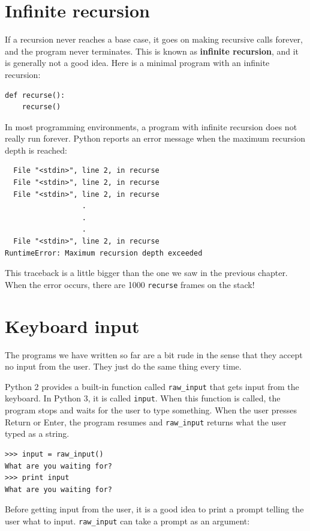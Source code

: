 \documentclass[10pt]{book}
\begin{document}
\begin{CJK}{UTF8}{gbsn}
\section{Infinite recursion}

If a recursion never reaches a base case, it goes on making
recursive calls forever, and the program never terminates.  This is
known as {\bf infinite recursion}, and it is generally not
a good idea.  Here is a minimal program with an infinite recursion:

\begin{verbatim}
def recurse():
    recurse()
\end{verbatim}
%
In most programming environments, a program with infinite recursion
does not really run forever.  Python reports an error
message when the maximum recursion depth is reached:

\begin{verbatim}
  File "<stdin>", line 2, in recurse
  File "<stdin>", line 2, in recurse
  File "<stdin>", line 2, in recurse
                  .   
                  .
                  .
  File "<stdin>", line 2, in recurse
RuntimeError: Maximum recursion depth exceeded
\end{verbatim}
%
This traceback is a little bigger than the one we saw in the
previous chapter.  When the error occurs, there are 1000
{\tt recurse} frames on the stack!


\section{Keyboard input}

The programs we have written so far are a bit rude in the sense that
they accept no input from the user.  They just do the same thing every
time.

Python 2 provides a built-in function called \verb"raw_input" that gets
input from the keyboard.  In Python 3, it is called
  {\tt input}.  When this function is called, the program stops and
waits for the user to type something.  When the user presses {\sf
  Return} or {\sf Enter}, the program resumes and \verb"raw_input"
returns what the user typed as a string.

\begin{verbatim}
>>> input = raw_input()
What are you waiting for?
>>> print input
What are you waiting for?
\end{verbatim}
%
Before getting input from the user, it is a good idea to print a
prompt telling the user what to input.  \verb"raw_input" can take a
prompt as an argument:


\end{CJK}
\end{document}
